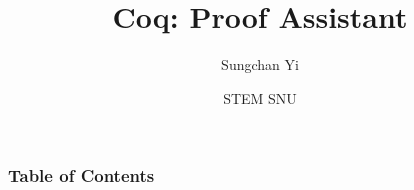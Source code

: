 \documentclass[aspectratio=169,handout]{beamer}
\title[Coq: Proof Assistant]{\textbf{Coq: Proof Assistant}}
\author[Department of CSE, Seoul National University]{Sungchan Yi}
\institute[]{May 12th, 2023}
\date{STEM SNU}
\begin{document}
\frame{\titlepage}

\begin{frame}
  \frametitle{Table of Contents}
  \tableofcontents[hideallsubsections]
\end{frame}



\frame{\titlepage}

%   
\end{document}

